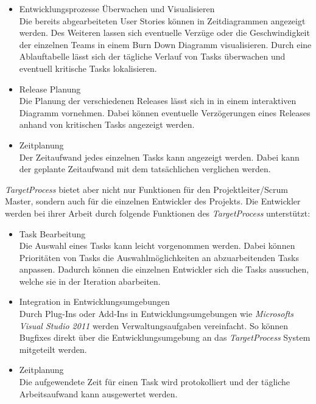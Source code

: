 \begin{description}
\begin{itemize}
\item Entwicklungsprozesse Überwachen und Visualisieren\\
Die bereits abgearbeiteten User Stories können in Zeitdiagrammen angezeigt werden. Des Weiteren lassen sich eventuelle Verzüge oder die Geschwindigkeit der einzelnen Teams in einem Burn Down Diagramm visualisieren. Durch eine Ablauftabelle lässt sich der tägliche Verlauf von Tasks überwachen und eventuell kritische Tasks lokalisieren.

\item Release Planung\\
Die Planung der verschiedenen Releases lässt sich in in einem interaktiven Diagramm vornehmen. Dabei können eventuelle Verzögerungen eines Releases anhand von kritischen Tasks angezeigt werden.

\item Zeitplanung\\
Der Zeitaufwand jedes einzelnen Tasks kann angezeigt werden. Dabei kann der geplante Zeitaufwand mit dem tatsächlichen verglichen werden.
\end{itemize}

\emph{TargetProcess} bietet aber nicht nur Funktionen für den Projektleiter/Scrum Master, sondern auch für die einzelnen Entwickler des Projekts. Die Entwickler werden bei ihrer Arbeit durch folgende Funktionen des \emph{TargetProcess} unterstützt:
\begin{itemize}
\item Task Bearbeitung\\
Die Auswahl eines Tasks kann leicht vorgenommen werden. Dabei können Prioritäten von Tasks die Auswahlmöglichkeiten an abzuarbeitenden Tasks anpassen. Dadurch können die einzelnen Entwickler sich die Tasks aussuchen, welche sie in der Iteration abarbeiten.

\item Integration in Entwicklungsumgebungen\\
Durch Plug-Ins oder Add-Ins in Entwicklungsumgebungen wie \emph{Microsofts Visual Studio 2011} werden Verwaltungsaufgaben vereinfacht. So können Bugfixes direkt über die Entwicklungsumgebung an das \emph{TargetProcess} System mitgeteilt werden.

\item Zeitplanung\\
Die aufgewendete Zeit für einen Task wird protokolliert und der tägliche Arbeitsaufwand kann ausgewertet werden.
\end{itemize}


\end{description}
